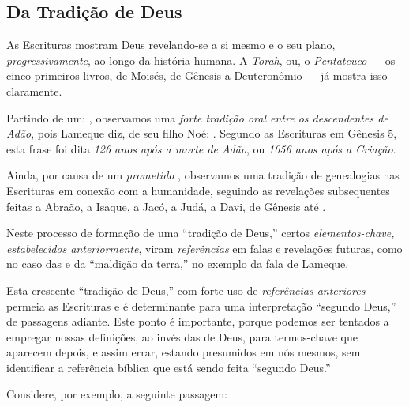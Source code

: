     \subsection{Da Tradição de Deus}

    As Escrituras mostram Deus revelando-se a si mesmo e o seu plano, \emph{progressivamente}, ao longo da  história  humana.  A
    \emph{Torah}, ou, o \emph{Pentateuco} --- os cinco primeiros livros, de Moisés, de Gênesis a Deuteronômio --- já mostra isso
    claramente.

    Partindo de um: , observamos uma \emph{forte tradição oral entre os descendentes de Adão}, pois  Lameque  diz,
    de seu filho Noé: . Segundo as Escrituras em Gênesis 5, esta frase foi dita \emph{126
    anos após a morte de Adão}, ou \emph{1056 anos após a Criação}.

    Ainda, por causa de um \emph{prometido} ,  observamos  uma  tradição  de
    genealogias nas Escrituras em conexão com a humanidade, seguindo as revelações subsequentes feitas a  Abraão,  a  Isaque,  a
    Jacó, a Judá, a Davi, de Gênesis até .

    Neste processo de formação de uma ``tradição de Deus,'' certos \emph{elementos-chave,  estabelecidos  anteriormente},  viram
    \emph{referências} em falas e revelações futuras, como no caso das  e da ``maldição da terra,''  no  exemplo
    da fala de Lameque.

    Esta crescente ``tradição de Deus,'' com forte uso de \emph{referências anteriores} permeia as Escrituras e  é  determinante
    para uma interpretação ``segundo Deus,'' de passagens adiante. Este ponto  é  importante,  porque  podemos  ser  tentados  a
    empregar nossas definições, ao invés das de Deus, para termos-chave que aparecem depois, e assim errar,  estando  presumidos
    em nós mesmos, sem identificar a referência bíblica que está sendo feita ``segundo Deus.''

    Considere, por exemplo, a seguinte passagem:


